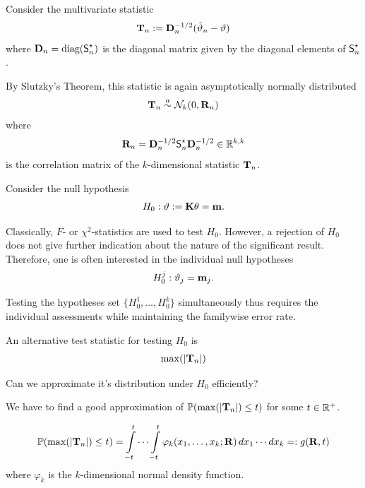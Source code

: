 \documentclass[landscape]{slides}
\begin{document}
Consider the multivariate statistic
\begin{eqnarray*}
\T_n := %
\D_n^{-1/2} (\hat{\vartheta}_n - \vartheta) 
\end{eqnarray*}
where $\mathbf{D}_n = \text{diag}(\textsf{S}^\star_n)$ is the diagonal matrix given by the diagonal elements of
$\textsf{S}^\star_n$.

By Slutzky's Theorem, this statistic is again asymptotically normally
distributed
\begin{eqnarray*}
\mathbf{T}_n \stackrel{a}{\sim} \mathcal{N}_k(0, \mathbf{R}_n)
\end{eqnarray*}
where
\begin{eqnarray*}
\mathbf{R}_n = \mathbf{D}_n^{-1/2} \textsf{S}^\star_n \mathbf{D}_n^{-1/2} \in \mathbb{R}^{k,k}
\end{eqnarray*}
is the correlation matrix of the $k$-dimensional statistic $\mathbf{T}_n$. 



Consider the null hypothesis
\begin{eqnarray*}
H_0: \vartheta := \mathbf{K} \theta = \mathbf{m}.
\end{eqnarray*}

Classically, $F$- or $\chi^2$-statistics are used to test $H_0$.
However, a rejection of $H_0$ 
does not give further indication about the nature of the significant
result. Therefore, one is often interested in the individual null hypotheses
\begin{eqnarray*}
H_0^j: \vartheta_j = \mathbf{m}_j.
\end{eqnarray*}

Testing the hypotheses set $\{H_0^1, \ldots, H_0^k\}$ simultaneously thus requires the individual
assessments while maintaining the familywise error rate.


An alternative test statistic for testing $H_0$ is
\begin{eqnarray*}
\max(|\mathbf{T}_n|)
\end{eqnarray*}

Can we approximate it's distribution under $H_0$ efficiently?

We have to find a good approximation of $\mathbb{P}(\max(|\mathbf{T}_n|) \le t)$
for some $t \in \mathbb{R}^+$.


\begin{eqnarray*}
\mathbb{P}(\max(|\mathbf{T}_n|) \le t) = \int\limits_{-t}^t \cdots \int\limits_{-t}^t
\varphi_k(x_1, \dots, x_k; \mathbf{R}) \, dx_1 \cdots dx_k =: g(\mathbf{R}, t) 
\end{eqnarray*}
where $\varphi_k$ is the $k$-dimensional normal density function.
\end{document}
